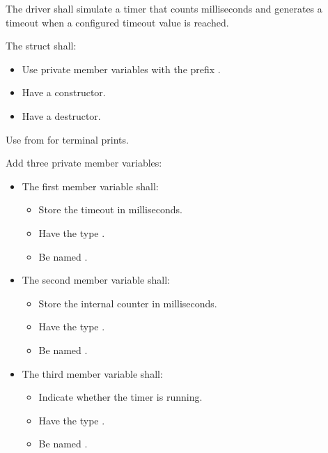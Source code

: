 \noindent The driver shall simulate a timer that counts milliseconds and generates a timeout when a
configured timeout value is reached.

The struct shall:
\begin{itemize}
  \item Use private member variables with the prefix .
  \item Have a constructor.
  \item Have a destructor.
\end{itemize}
Use  from  for terminal prints.

Add three private member variables:
\begin{itemize}
  \item The first member variable shall:
  \begin{itemize}
    \item Store the timeout in milliseconds.
    \item Have the type .
    \item Be named .
  \end{itemize}
  \item The second member variable shall:
  \begin{itemize}
    \item Store the internal counter in milliseconds.
    \item Have the type .
    \item Be named .
  \end{itemize}
  \item The third member variable shall:
  \begin{itemize}
    \item Indicate whether the timer is running.
    \item Have the type .
    \item Be named .
  \end{itemize}
\end{itemize}

